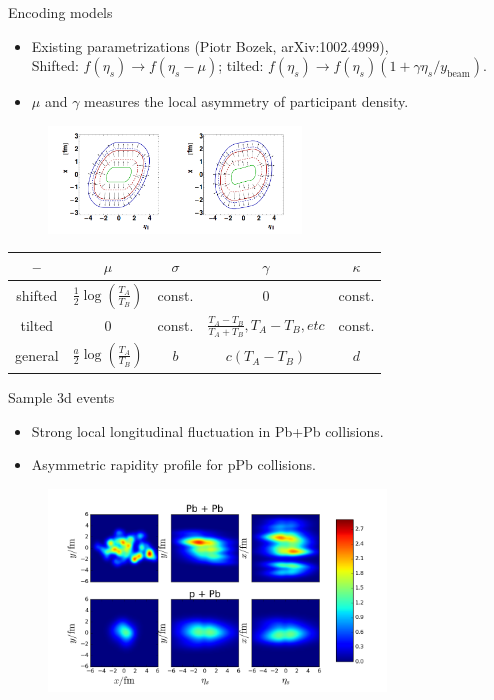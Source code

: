 \documentclass[11pt]{beamer}
\begin{document}
\begin{frame}{Encoding models}
\begin{itemize}
\item Existing parametrizations (Piotr Bozek, arXiv:1002.4999),\\
Shifted: $f(\eta_s) \rightarrow f(\eta_s - \mu)$;  tilted: $f(\eta_s) \rightarrow f(\eta_s) \left(1 + \gamma\eta_s/y_{\textrm{beam}}\right)$.
\item $\mu$ and $\gamma$ measures the local asymmetry of participant density.
\end{itemize}
\begin{center} 
\begin{figure}
\includegraphics[width=0.6\textwidth]{pics/Pitor.png} 
\end{figure}
\begin{tabular}{c|c|c|c|c}
\hline
--	&	$\mu$	& $\sigma$ & $\gamma$ & $\kappa$	\\
\hline
shifted & $\frac{1}{2}\log\left(\frac{T_A}{T_B}\right)$ & const. & $0$	& const. \\
tilted & $0$ & const. & $\frac{T_A-T_B}{T_A+T_B}, T_A - T_B, etc$	& const.\\
general & $\frac{a}{2}\log\left(\frac{T_A}{T_B}\right)$ & $b$ & $c(T_A - T_B)$ & $d$ \\
\hline
\end{tabular}
\end{center}
\end{frame}

\begin{frame}{Sample 3d events}
\begin{itemize}
\item Strong local longitudinal fluctuation in Pb+Pb collisions.
\item Asymmetric rapidity profile for pPb collisions.
\end{itemize}
\begin{figure}
\begin{center}
\includegraphics[width = 0.8\textwidth]{./pics/3d-example.png}
\end{center}
\end{figure}
\end{frame}
\end{document}
